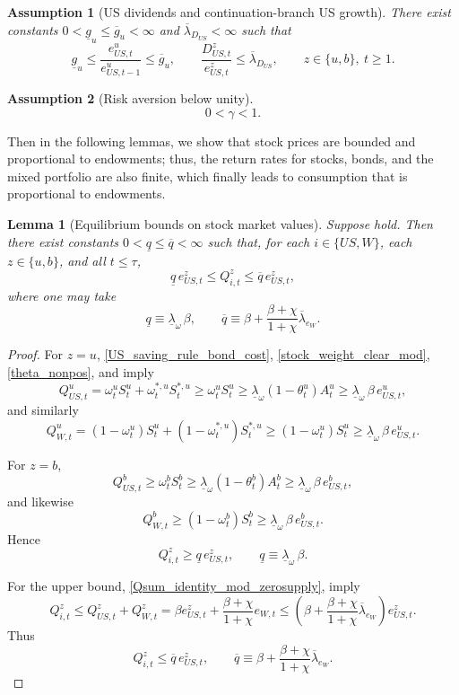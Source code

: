 \documentclass[12pt]{article}
\theoremstyle{plain}
\newtheorem{ass}{Assumption}
\newtheorem{lem}{Lemma}
\begin{document}
\begin{ass}[US dividends and continuation-branch US growth]\label{ass_u_dividend_growth}
There exist constants $0<\underline g_u\le \overline g_u<\infty$ and
$\overline\lambda_{D_{US}}<\infty$ such that
\[
\underline g_u
\le
\frac{e_{US,t}^u}{e_{US,t-1}^u}
\le
\overline g_u,
\qquad
\frac{D_{US,t}^z}{e_{US,t}^z}
\le
\overline\lambda_{D_{US}},
\qquad z\in\{u,b\},\ t\ge 1.
\]
\end{ass}

\begin{ass}[Risk aversion below unity]\label{ass_gamma_lt_one}
\[
0<\gamma<1.
\]
\end{ass}

Then in the following lemmas, we show that stock prices are bounded and proportional to endowments; thus, the return rates for stocks, bonds, and the mixed portfolio are also finite, which finally leads to consumption that is proportional to endowments.

\begin{lem}[Equilibrium bounds on stock market values]\label{lem_stock_value_bounds}
Suppose
hold. Then there exist constants $0<\underline q\le \overline q<\infty$ such that, for each
$i\in\{US,W\}$, each $z\in\{u,b\}$, and all $t\le\tau$,
\[
\underline q\,e_{US,t}^z
\le
Q_{i,t}^z
\le
\overline q\,e_{US,t}^z,
\]
where one may take
\[
\underline q\equiv \underline\lambda_\omega\,\beta,
\qquad
\overline q\equiv
\beta
+\frac{\beta+\chi}{1+\chi}\overline\lambda_{e_W}.
\]
\end{lem}

\begin{proof}
For $z=u$, \eqref{US_saving_rule_bond_cost}, \eqref{stock_weight_clear_mod},  \eqref{theta_nonpos}, and
 imply
\[
Q_{US,t}^u
=
\omega_t^u S_t^u+\omega_t^{*,u}S_t^{*,u}
\ge
\omega_t^u S_t^u
\ge
\underline\lambda_\omega(1-\theta_t^u)A_t^u
\ge
\underline\lambda_\omega\,\beta\,e_{US,t}^u,
\]
and similarly
\[
Q_{W,t}^u
=
(1-\omega_t^u)S_t^u+(1-\omega_t^{*,u})S_t^{*,u}
\ge
(1-\omega_t^u)S_t^u
\ge
\underline\lambda_\omega\,\beta\,e_{US,t}^u.
\]

For $z=b$, 
\[
Q_{US,t}^b
\ge
\omega_t^b S_t^b
\ge
\underline\lambda_\omega(1-\theta_t^b)A_t^b
\ge
\underline\lambda_\omega\,\beta\,e_{US,t}^b,
\]
and likewise
\[
Q_{W,t}^b
\ge
(1-\omega_t^b)S_t^b
\ge
\underline\lambda_\omega\,\beta \,e_{US,t}^b.
\]
Hence
\[
Q_{i,t}^z\ge \underline q\,e_{US,t}^z,
\qquad
\underline q\equiv \underline\lambda_\omega\,\beta.
\]

For the upper bound, \eqref{Qsum_identity_mod_zerosupply},
 imply
\[
Q_{i,t}^z
\le
Q_{US,t}^z+Q_{W,t}^z
=
\beta e_{US,t}^z+\frac{\beta+\chi}{1+\chi}e_{W,t}
\le
\left(
\beta
+\frac{\beta+\chi}{1+\chi}\overline\lambda_{e_W}
\right)e_{US,t}^z.
\]
Thus
\[
Q_{i,t}^z\le \overline q\,e_{US,t}^z,
\qquad
\overline q\equiv
\beta
+\frac{\beta+\chi}{1+\chi}\overline\lambda_{e_W}.
\]
\end{proof}
\end{document}
